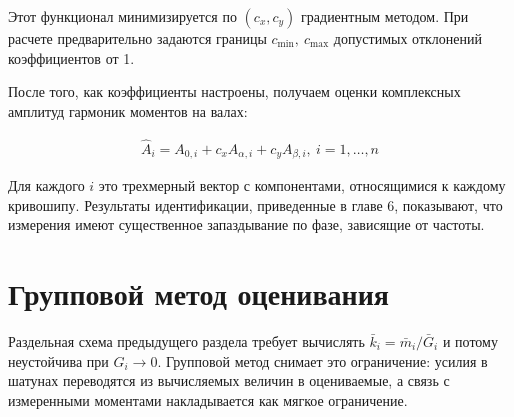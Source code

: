 Этот функционал минимизируется по $\left(c_x, c_y\right)$ градиентным методом. При расчете предварительно задаются границы $c_{\min},~c_{\max}$ допустимых отклонений коэффициентов от 1.

После того, как коэффициенты настроены, получаем оценки комплексных амплитуд гармоник моментов на валах:

\begin{equation}
\begin{aligned}
	\hat{A}_i = A_{0,i} + c_xA_{\alpha,i} + c_yA_{\beta,i},~i=1,\ldots,n
\end{aligned}
\end{equation}

Для каждого $i$ это трехмерный вектор с компонентами, относящимися к каждому кривошипу.
Результаты идентификации, приведенные в главе 6, показывают, что измерения имеют существенное запаздывание по фазе, зависящие от частоты.
%

\section{Групповой метод оценивания}
\label{sec:GroupMethod}

Раздельная схема предыдущего раздела требует вычислять $\bar{k}_i = \bar{m}_i/\bar{G}_i$ и потому неустойчива при $G_i \to 0$. Групповой метод снимает это ограничение: усилия в шатунах переводятся из вычисляемых величин в оцениваемые, а связь с измеренными моментами накладывается как мягкое ограничение.

